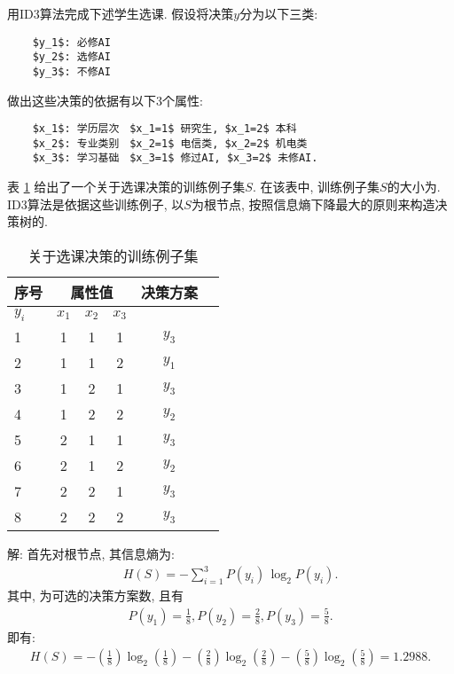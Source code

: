 \begin{example}
用ID3算法完成下述学生选课.
假设将决策$y$分为以下三类:
\begin{Verbatim}
    $y_1$: 必修AI
    $y_2$: 选修AI
    $y_3$: 不修AI
\end{Verbatim}

做出这些决策的依据有以下3个属性:
\begin{Verbatim}
    $x_1$: 学历层次　$x_1=1$ 研究生, $x_1=2$ 本科
    $x_2$: 专业类别　$x_2=1$ 电信类, $x_2=2$ 机电类
    $x_3$: 学习基础　$x_3=1$ 修过AI, $x_3=2$ 未修AI.
\end{Verbatim}
\vspace{-0.45cm}
\end{example}

表 \ref{AItable20122435} 给出了一个关于选课决策的训练例子集$S$. 在该表中, 训练例子集$S$的大小为. ID3算法是依据这些训练例子, 以$S$为根节点, 按照信息熵下降最大的原则来构造决策树的.
\begin{table} [!tb]
\vspace{-0.2cm}
\caption{关于选课决策的训练例子集}
\vspace{-0.2cm}
\begin{center}
\begin{tabular} {lccccc}
\hline
序号& \multicolumn{3}{c}{属性值}&决策方案\\
\hline
$y_i$&$x_1$&$x_2$&$x_3$\\
1	&1	&1	&1&	$y_3$\\
2	&1&	1&	2&	$y_1$\\
3	&1&2&1&$y_3$\\
4&1&2&2&$y_2$\\
5&2&1&1&$y_3$\\
6&2&1&2&$y_2$\\
7&2&2&1&$y_3$\\
8&2&2&2&$y_3$\\
\hline
\end{tabular}
\end{center}
\label{AItable20122435}
\end{table}

解:  首先对根节点, 其信息熵为:
\begin{align}
    H(S)=-\sum_{i=1}^{3} P\left (y_{i}\right)\, \log_ {2} P\left (y_{i}\right).
\end{align}
其中, 为可选的决策方案数, 且有
\begin{align}
    P(y_1)=\frac 1 8, P (y_2)=\frac 2 8, P (y_3)=\frac 5 8.
\end{align}
即有:
\begin{align}
    H(S)= -\left (\frac 1 8\right)\log_2 \left (\frac 1 8\right)- \left (\frac 2 8\right)\log_ 2\left (\frac 2 8 \right)- \left (\frac 5 8\right)\log_ 2\left (\frac 5 8\right) =1.2988.
\end{align}

